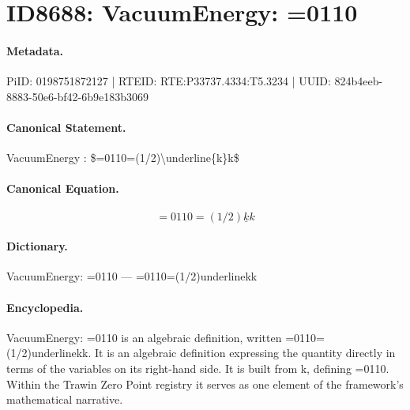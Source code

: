 \section*{ID8688: VacuumEnergy: =0110}
\paragraph{Metadata.}
PiID: 0198751872127 | RTEID: RTE:P33737.4334:T5.3234 | UUID: 824b4eeb-8883-50e6-bf42-6b9e183b3069

\paragraph{Canonical Statement.}
VacuumEnergy : \$=0110=(1/2)\textbackslash{}underline\{k\}k\$

\paragraph{Canonical Equation.}
\[
=0110=(1/2)\underline{k}k
\]

\paragraph{Dictionary.}
VacuumEnergy: =0110 — =0110=(1/2)underlinekk

\paragraph{Encyclopedia.}
VacuumEnergy: =0110 is an algebraic definition, written =0110=(1/2)underlinekk. It is an algebraic definition expressing the quantity directly in terms of the variables on its right-hand side. It is built from k, defining =0110. Within the Trawin Zero Point registry it serves as one element of the framework's mathematical narrative.
